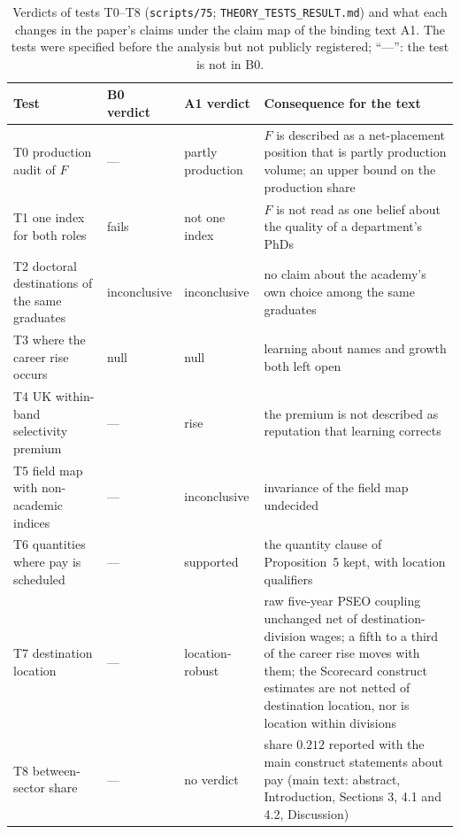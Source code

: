 \documentclass[11pt]{article}
\newcommand{\scr}[1]{\texttt{scripts/#1}}
\begin{document}
\begin{table}[!tbp]
\centering
\caption{Verdicts of tests T0--T8 (\scr{75}; \texttt{THEORY\_TESTS\_RESULT.md}) and what each changes in the
paper's claims under the claim map of the binding text A1. The tests were specified before the analysis but not
publicly registered; ``---'': the test is not in B0.}\label{tab:T-verdicts}
\footnotesize
\begin{tabular}{@{}>{\raggedright\arraybackslash}p{3.2cm}>{\raggedright\arraybackslash}p{1.7cm}>{\raggedright\arraybackslash}p{2.7cm}>{\raggedright\arraybackslash}p{7.6cm}@{}}
\toprule
Test & B0 verdict & A1 verdict & Consequence for the text \\
\midrule
T0 production audit of $F$ & --- & partly production & $F$ is described as a net-placement position that is partly production volume; an upper bound on the production share \\
T1 one index for both roles & fails & not one index & $F$ is not read as one belief about the quality of a department's PhDs \\
T2 doctoral destinations of the same graduates & inconclusive & inconclusive & no claim about the academy's own choice among the same graduates \\
T3 where the career rise occurs & null & null & learning about names and growth both left open \\
T4 UK within-band selectivity premium & --- & rise & the premium is not described as reputation that learning corrects \\
T5 field map with non-academic indices & --- & inconclusive & invariance of the field map undecided \\
T6 quantities where pay is scheduled & --- & supported & the quantity clause of Proposition~5 kept, with location qualifiers \\
T7 destination location & --- & location-robust & raw five-year PSEO coupling unchanged net of destination-division wages; a fifth to a third of the career rise moves with them; the Scorecard construct estimates are not netted of destination location, nor is location within divisions \\
T8 between-sector share & --- & no verdict & share $0.212$ reported with the main construct statements about pay (main text: abstract, Introduction, Sections 3, 4.1 and 4.2, Discussion) \\
\bottomrule
\end{tabular}
\end{table}
\end{document}
